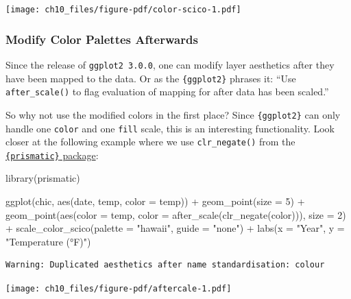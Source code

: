 \documentclass[
  letterpaper,
  DIV=11,
  numbers=noendperiod]{scrreprt}
\newenvironment{Shaded}{\begin{snugshade}}{\end{snugshade}}
\newcommand{\AttributeTok}[1]{\textcolor[rgb]{0.40,0.45,0.13}{#1}}
\newcommand{\DecValTok}[1]{\textcolor[rgb]{0.68,0.00,0.00}{#1}}
\newcommand{\FunctionTok}[1]{\textcolor[rgb]{0.28,0.35,0.67}{#1}}
\newcommand{\NormalTok}[1]{\textcolor[rgb]{0.00,0.23,0.31}{#1}}
\newcommand{\SpecialCharTok}[1]{\textcolor[rgb]{0.37,0.37,0.37}{#1}}
\newcommand{\StringTok}[1]{\textcolor[rgb]{0.13,0.47,0.30}{#1}}
\begin{document}
\texttt{[image: ch10\_files/figure-pdf/color-scico-1.pdf]}

\subsubsection{Modify Color Palettes
Afterwards}\label{modify-color-palettes-afterwards}

Since the release of \texttt{ggplot2\ 3.0.0}, one can modify layer
aesthetics after they have been mapped to the data. Or as the
\texttt{\{ggplot2\}} phrases it: ``Use \texttt{after\_scale()} to flag
evaluation of mapping for after data has been scaled.''

So why not use the modified colors in the first place? Since
\texttt{\{ggplot2\}} can only handle one \texttt{color} and one
\texttt{fill} scale, this is an interesting functionality. Look closer
at the following example where we use \texttt{clr\_negate()} from the
\href{https://emilhvitfeldt.github.io/prismatic/}{\texttt{\{prismatic\}}
package}:

\begin{Shaded}
\begin{Highlighting}[]
\FunctionTok{library}\NormalTok{(prismatic)}

\FunctionTok{ggplot}\NormalTok{(chic, }\FunctionTok{aes}\NormalTok{(date, temp, }\AttributeTok{color =}\NormalTok{ temp)) }\SpecialCharTok{+}
  \FunctionTok{geom\_point}\NormalTok{(}\AttributeTok{size =} \DecValTok{5}\NormalTok{) }\SpecialCharTok{+}
  \FunctionTok{geom\_point}\NormalTok{(}\FunctionTok{aes}\NormalTok{(}\AttributeTok{color =}\NormalTok{ temp,}
                 \AttributeTok{color =} \FunctionTok{after\_scale}\NormalTok{(}\FunctionTok{clr\_negate}\NormalTok{(color))),}
             \AttributeTok{size =} \DecValTok{2}\NormalTok{) }\SpecialCharTok{+}
  \FunctionTok{scale\_color\_scico}\NormalTok{(}\AttributeTok{palette =} \StringTok{"hawaii"}\NormalTok{, }\AttributeTok{guide =} \StringTok{"none"}\NormalTok{) }\SpecialCharTok{+}
  \FunctionTok{labs}\NormalTok{(}\AttributeTok{x =} \StringTok{"Year"}\NormalTok{, }\AttributeTok{y =} \StringTok{"Temperature (°F)"}\NormalTok{)}
\end{Highlighting}
\end{Shaded}

\begin{verbatim}
Warning: Duplicated aesthetics after name standardisation: colour
\end{verbatim}

\texttt{[image: ch10\_files/figure-pdf/aftercale-1.pdf]}
\end{document}

